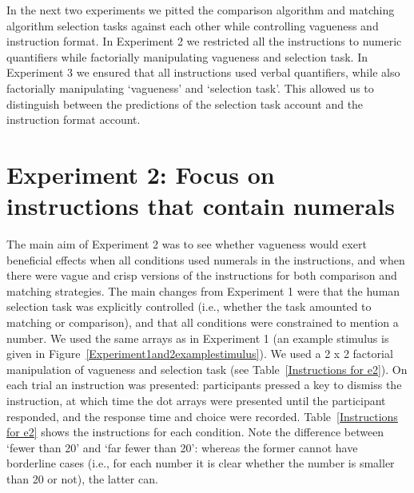 \documentclass[ %
  graybox       %
 ,envcountchap  %
 ,sectrefs      %
]{svmono}
\begin{document}
In the next two experiments we pitted the comparison algorithm and matching algorithm selection tasks against each other while controlling vagueness and instruction format. In Experiment 2 we restricted all the instructions to numeric quantifiers while factorially manipulating vagueness and selection task. In Experiment 3 we ensured that all instructions used verbal quantifiers, while also factorially manipulating `vagueness' and `selection task'. This allowed us to distinguish between the predictions of the selection task account and the instruction format account.

\section{Experiment 2: Focus on instructions that contain numerals}
The main aim of Experiment 2 was to see whether vagueness would exert beneficial effects when all conditions used numerals in the instructions, and when there were vague and crisp versions of the instructions for both comparison and matching strategies. The main changes from Experiment 1 were that the human selection task was explicitly controlled (i.e., whether the task amounted to matching or comparison), and that all conditions were constrained to mention a number. We used the same arrays as in Experiment 1 (an example stimulus is given in Figure~\ref{Experiment1and2examplestimulus}). We used a 2 x 2 factorial manipulation of vagueness and selection task (see Table~\ref{Instructions for e2}). On each trial an instruction was presented: participants pressed a key to dismiss the instruction, at which time the dot arrays were presented until the participant responded, and the response time and choice were recorded. Table~\ref{Instructions for e2} shows the instructions for each condition. Note the difference between `fewer than 20' and `far fewer than 20': whereas the former cannot have borderline cases (i.e., for each number it is clear whether the number is smaller than 20 or not), the latter can.
\end{document}
